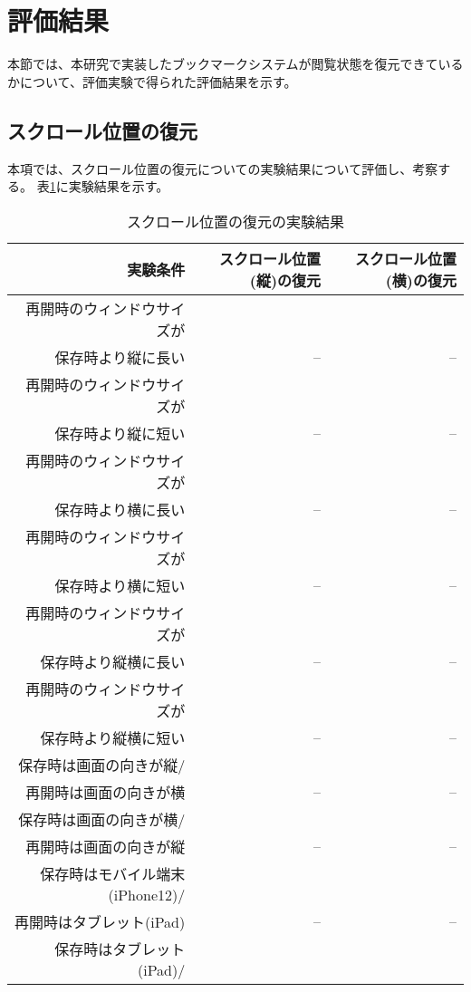 \section{評価結果}
本節では、本研究で実装したブックマークシステムが閲覧状態を復元できているかについて、評価実験で得られた評価結果を示す。

\subsection{スクロール位置の復元}
本項では、スクロール位置の復元についての実験結果について評価し、考察する。
表\ref{tb:evl-result-scroll-position}に実験結果を示す。

\begin{table}[htbp]
  \caption{スクロール位置の復元の実験結果}
  \label{tb:evl-result-scroll-position}
  \begin{center}
    \begin{tabular}{rrr}
      \hline
      実験条件 & スクロール位置(縦)の復元 & スクロール位置(横)の復元 \\ \hline \hline
      再開時のウィンドウサイズが\\
      保存時より縦に長い & -- & -- \\ \hline
      再開時のウィンドウサイズが\\
      保存時より縦に短い & -- & -- \\ \hline
      再開時のウィンドウサイズが\\
      保存時より横に長い & -- & -- \\ \hline
      再開時のウィンドウサイズが\\
      保存時より横に短い & -- & -- \\ \hline
      再開時のウィンドウサイズが\\
      保存時より縦横に長い & -- & -- \\ \hline
      再開時のウィンドウサイズが\\
      保存時より縦横に短い & -- & -- \\ \hline
      保存時は画面の向きが縦/\\
      再開時は画面の向きが横 & -- & -- \\ \hline
      保存時は画面の向きが横/\\
      再開時は画面の向きが縦 & -- & -- \\ \hline
      保存時はモバイル端末(iPhone12)/\\
      再開時はタブレット(iPad) & -- & -- \\ \hline
      保存時はタブレット(iPad)/\\

\end{tabular}
\end{center}
\end{table}
